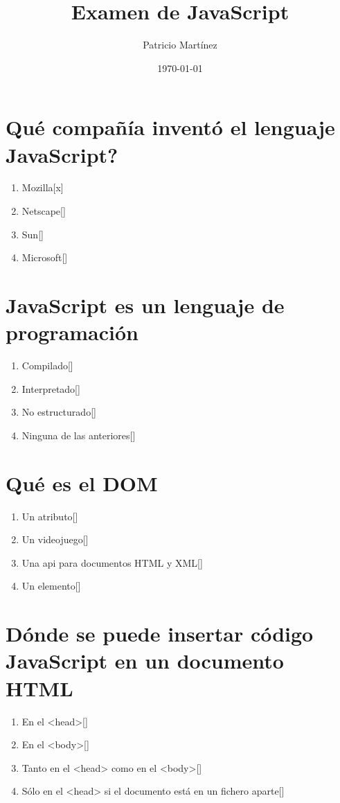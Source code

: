 \documentclass[addpoints, 12]{exam}{article}
\author{Patricio Martínez}
\date{\today}
\title{Examen de JavaScript}
\begin{document}
\maketitle

\section{Qué compañía inventó el lenguaje JavaScript?}
\label{sec:orgc5db151}
\begin{enumerate}
\item Mozilla[x]
\item Netscape[]
\item Sun[]
\item Microsoft[]
\end{enumerate}

\section{JavaScript es un lenguaje de programación}
\label{sec:org97f8b99}
\begin{enumerate}
\item Compilado[]
\item Interpretado[]
\item No estructurado[]
\item Ninguna de las anteriores[]
\end{enumerate}

\section{Qué es el DOM}
\label{sec:orgc06d199}
\begin{enumerate}
\item Un atributo[]
\item Un videojuego[]
\item Una api para documentos HTML y XML[]
\item Un elemento[]
\end{enumerate}

\section{Dónde se puede insertar código JavaScript en un documento HTML}
\label{sec:orgc2d62fb}
\begin{enumerate}
\item En el <head>[]
\item En el <body>[]
\item Tanto en el <head> como en el <body>[]
\item Sólo en el <head> si el documento está en un fichero aparte[]
\end{enumerate}
\end{document}
